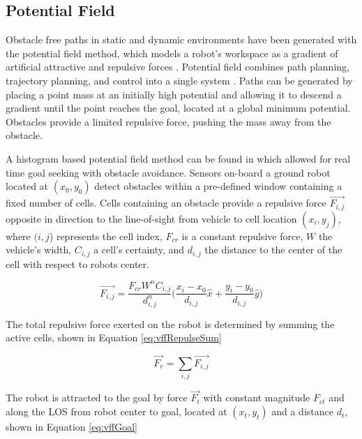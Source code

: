 \documentclass[conf]{new-aiaa}
\begin{document}
\subsection{Potential Field}
Obstacle free paths in static and dynamic environments have been generated with the potential field method, which models a robot's workspace as a gradient of artificial attractive and repulsive forces \cite{khatib_real-time_1986}. Potential field combines path planning, trajectory planning, and control into a single system \cite{rimon_exact_1992}. Paths can be generated by placing a point mass at an initially high potential and allowing it to descend a gradient until the point reaches the goal, located at a global minimum potential. Obstacles provide a limited repulsive force, pushing the mass away from the obstacle. 


A histogram based potential field method can be found in \cite{borenstein_real-time_1990,borenstein_vector_1991,koren_potential_1991} which allowed for real time goal seeking with obstacle avoidance. Sensors on-board a ground robot located at $(x_0,y_0)$ detect obstacles within a pre-defined window containing a fixed number of cells. Cells containing an obstacle provide a repulsive force $\overrightarrow{F_{i,j}}$ opposite in direction to the line-of-sight from vehicle to cell location $(x_i,y_j)$, where $(i,j$) represents the cell index, $F_{cr}$ is a constant repulsive force, $W$ the vehicle's width, $C_{i,j}$ a cell's certainty, and $d_{i,j}$ the distance to the center of the cell with respect to robots center.

\begin{equation}\label{eq:vffRepulse}
\overrightarrow{F_{i,j}} = \frac{F_{cr}W^nC_{i,j}}{d^n_{i,j}} \bigg( \frac{x_i-x_0}{d_{i,j}}\hat{x} + \frac{y_i-y_0}{d_{i,j}}\hat{y}\bigg)
\end{equation}

The total repulsive force exerted on the robot is determined by summing the active cells, shown in Equation \ref{eq:vffRepulseSum}


\begin{equation}\label{eq:vffRepulseSum}
\overrightarrow{F_r} = \sum_{i,j}\overrightarrow{F_{i,j}}
\end{equation}

The robot is attracted to the goal by force $\overrightarrow{F_t}$ with constant magnitude $F_{ct}$ and along the LOS from robot center to goal, located at $(x_t,y_t)$ and a distance $d_t$, shown in Equation \ref{eq:vffGoal}
\end{document}
